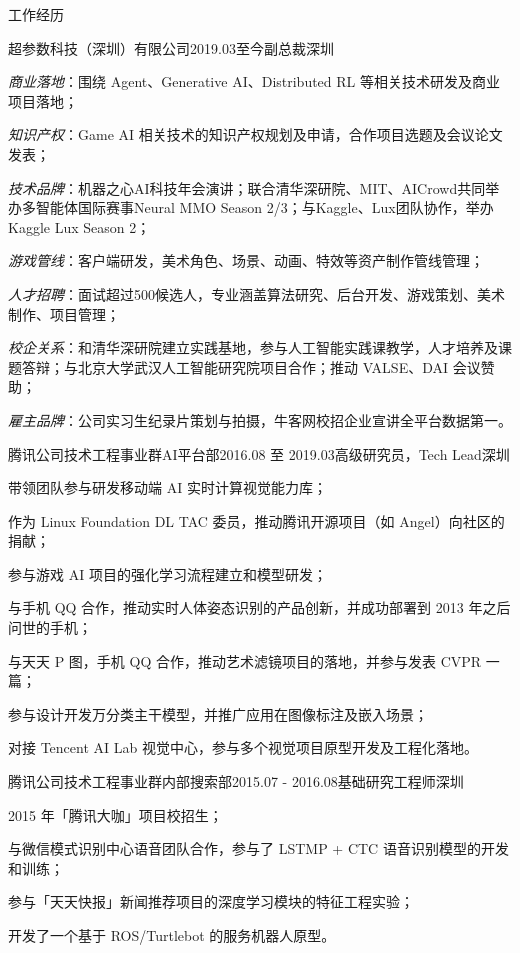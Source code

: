 \documentclass[UTF8]{cv_professional-cn} %
\begin{document}
\begin{rSection}{工作经历}

  \begin{rSubsection}{超参数科技（深圳）有限公司}{2019.03至今}{副总裁}{深圳}
    \item \textit{商业落地}：围绕 Agent、Generative AI、Distributed RL 等相关技术研发及商业项目落地；
    \item \textit{知识产权}：Game AI 相关技术的知识产权规划及申请，合作项目选题及会议论文发表；
    \item \textit{技术品牌}：机器之心AI科技年会演讲；联合清华深研院、MIT、AICrowd共同举办多智能体国际赛事Neural MMO Season 2/3；与Kaggle、Lux团队协作，举办Kaggle Lux Season 2；
    \item \textit{游戏管线}：客户端研发，美术角色、场景、动画、特效等资产制作管线管理；
    \item \textit{人才招聘}：面试超过500候选人，专业涵盖算法研究、后台开发、游戏策划、美术制作、项目管理；
    \item \textit{校企关系}：和清华深研院建立实践基地，参与人工智能实践课教学，人才培养及课题答辩；与北京大学武汉人工智能研究院项目合作；推动 VALSE、DAI 会议赞助；
    \item \textit{雇主品牌}：公司实习生纪录片策划与拍摄，牛客网校招企业宣讲全平台数据第一。
  \end{rSubsection}

  \begin{rSubsection}{腾讯公司技术工程事业群AI平台部}{2016.08 至 2019.03}{高级研究员，Tech Lead}{深圳}
    \item 带领团队参与研发移动端 AI 实时计算视觉能力库；
    \item 作为 Linux Foundation DL TAC 委员，推动腾讯开源项目（如 Angel）向社区的捐献；
    \item 参与游戏 AI 项目的强化学习流程建立和模型研发；
    \item 与手机 QQ 合作，推动实时人体姿态识别的产品创新，并成功部署到 2013 年之后问世的手机；
    \item 与天天 P 图，手机 QQ 合作，推动艺术滤镜项目的落地，并参与发表 CVPR 一篇；
    \item 参与设计开发万分类主干模型，并推广应用在图像标注及嵌入场景；
    \item 对接 Tencent AI Lab 视觉中心，参与多个视觉项目原型开发及工程化落地。
  \end{rSubsection}

	\begin{rSubsection}{腾讯公司技术工程事业群内部搜索部}{2015.07 - 2016.08}{基础研究工程师}{深圳}
		\item 2015 年「腾讯大咖」项目校招生；
		\item 与微信模式识别中心语音团队合作，参与了 LSTMP + CTC 语音识别模型的开发和训练；
		\item 参与「天天快报」新闻推荐项目的深度学习模块的特征工程实验；
		\item 开发了一个基于 ROS/Turtlebot 的服务机器人原型。
	\end{rSubsection}

\end{rSection}
\end{document}
